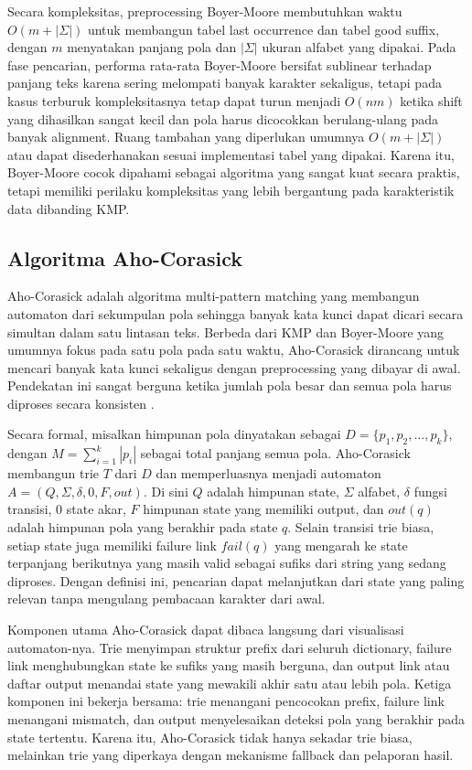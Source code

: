 Secara kompleksitas, preprocessing Boyer-Moore membutuhkan waktu $O(m + |\Sigma|)$ untuk membangun tabel last occurrence dan tabel good suffix, dengan $m$ menyatakan panjang pola dan $|\Sigma|$ ukuran alfabet yang dipakai. Pada fase pencarian, performa rata-rata Boyer-Moore bersifat sublinear terhadap panjang teks karena sering melompati banyak karakter sekaligus, tetapi pada kasus terburuk kompleksitasnya tetap dapat turun menjadi $O(nm)$ ketika shift yang dihasilkan sangat kecil dan pola harus dicocokkan berulang-ulang pada banyak alignment. Ruang tambahan yang diperlukan umumnya $O(m + |\Sigma|)$ atau dapat disederhanakan sesuai implementasi tabel yang dipakai. Karena itu, Boyer-Moore cocok dipahami sebagai algoritma yang sangat kuat secara praktis, tetapi memiliki perilaku kompleksitas yang lebih bergantung pada karakteristik data dibanding KMP.


\subsection{Algoritma Aho-Corasick}

Aho-Corasick adalah algoritma multi-pattern matching yang membangun automaton dari sekumpulan pola sehingga banyak kata kunci dapat dicari secara simultan dalam satu lintasan teks. Berbeda dari KMP dan Boyer-Moore yang umumnya fokus pada satu pola pada satu waktu, Aho-Corasick dirancang untuk mencari banyak kata kunci sekaligus dengan preprocessing yang dibayar di awal. Pendekatan ini sangat berguna ketika jumlah pola besar dan semua pola harus diproses secara konsisten \cite{aho1975efficient}.

Secara formal, misalkan himpunan pola dinyatakan sebagai $D = \{p_1, p_2, \dots, p_k\}$, dengan $M = \sum_{i=1}^{k} |p_i|$ sebagai total panjang semua pola. Aho-Corasick membangun trie $T$ dari $D$ dan memperluasnya menjadi automaton $A = (Q, \Sigma, \delta, 0, F, out)$. Di sini $Q$ adalah himpunan state, $\Sigma$ alfabet, $\delta$ fungsi transisi, $0$ state akar, $F$ himpunan state yang memiliki output, dan $out(q)$ adalah himpunan pola yang berakhir pada state $q$. Selain transisi trie biasa, setiap state juga memiliki failure link $fail(q)$ yang mengarah ke state terpanjang berikutnya yang masih valid sebagai sufiks dari string yang sedang diproses. Dengan definisi ini, pencarian dapat melanjutkan dari state yang paling relevan tanpa mengulang pembacaan karakter dari awal.

Komponen utama Aho-Corasick dapat dibaca langsung dari visualisasi automaton-nya. Trie menyimpan struktur prefix dari seluruh dictionary, failure link menghubungkan state ke sufiks yang masih berguna, dan output link atau daftar output menandai state yang mewakili akhir satu atau lebih pola. Ketiga komponen ini bekerja bersama: trie menangani pencocokan prefix, failure link menangani mismatch, dan output menyelesaikan deteksi pola yang berakhir pada state tertentu. Karena itu, Aho-Corasick tidak hanya sekadar trie biasa, melainkan trie yang diperkaya dengan mekanisme fallback dan pelaporan hasil.

